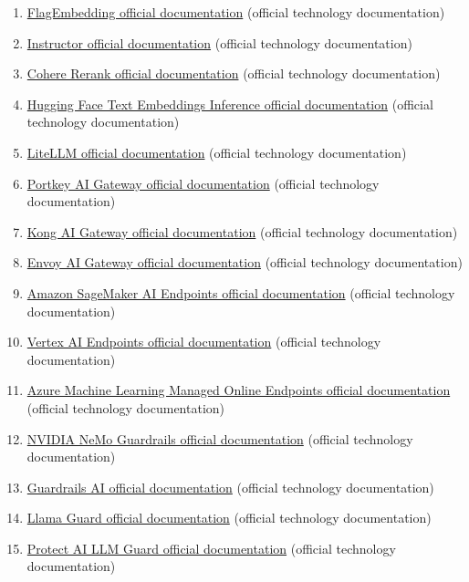 \begin{enumerate}
\item \href{https://bge-model.com/}{FlagEmbedding official documentation} (official technology documentation)
\item \href{https://python.useinstructor.com/}{Instructor official documentation} (official technology documentation)
\item \href{https://docs.cohere.com/docs/rerank-overview}{Cohere Rerank official documentation} (official technology documentation)
\item \href{https://huggingface.co/docs/text-embeddings-inference/index}{Hugging Face Text Embeddings Inference official documentation} (official technology documentation)
\item \href{https://docs.litellm.ai/}{LiteLLM official documentation} (official technology documentation)
\item \href{https://portkey.ai/docs/}{Portkey AI Gateway official documentation} (official technology documentation)
\item \href{https://developer.konghq.com/ai-gateway/}{Kong AI Gateway official documentation} (official technology documentation)
\item \href{https://aigateway.envoyproxy.io/docs/}{Envoy AI Gateway official documentation} (official technology documentation)
\item \href{https://docs.aws.amazon.com/sagemaker/latest/dg/deploy-model.html}{Amazon SageMaker AI Endpoints official documentation} (official technology documentation)
\item \href{https://cloud.google.com/vertex-ai/docs/predictions/overview}{Vertex AI Endpoints official documentation} (official technology documentation)
\item \href{https://learn.microsoft.com/en-us/azure/machine-learning/concept-endpoints-online}{Azure Machine Learning Managed Online Endpoints official documentation} (official technology documentation)
\item \href{https://docs.nvidia.com/nemo/guardrails/latest/}{NVIDIA NeMo Guardrails official documentation} (official technology documentation)
\item \href{https://www.guardrailsai.com/docs}{Guardrails AI official documentation} (official technology documentation)
\item \href{https://www.llama.com/docs/model-cards-and-prompt-formats/llama-guard-4/}{Llama Guard official documentation} (official technology documentation)
\item \href{https://protectai.github.io/llm-guard/}{Protect AI LLM Guard official documentation} (official technology documentation)

\end{enumerate}
